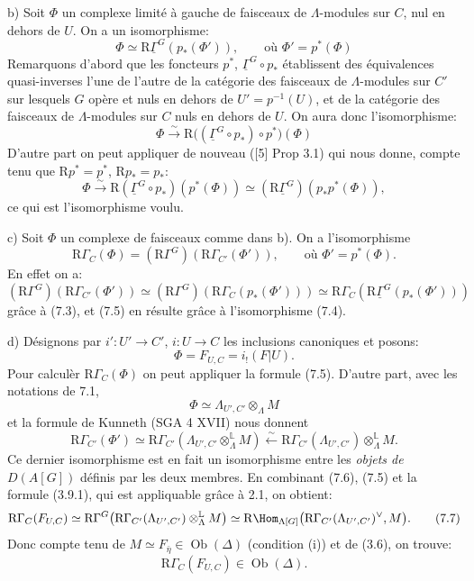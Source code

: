 b) Soit $\Phi$ un complexe limité à gauche de faisceaux de $\Lambda$-modules sur $C$, nul en dehors de $U$. On a un isomorphisme:
\[
\Phi\simeq \mathrm{R}\underline{\Gamma}^G(p_*(\Phi')),
\qquad\text{où } \Phi'=p^*(\Phi)
\tag{7.4}
\]
Remarquons d'abord que les foncteurs $p^*$, $\underline{\Gamma}^G\circ p_*$ établissent des équivalences quasi-inverses l'une de l'autre de la catégorie des faisceaux de $\Lambda$-modules sur $C'$ sur lesquels $G$ opère et nuls en dehors de $U'=p^{-1}(U)$, et de la catégorie des faisceaux de $\Lambda$-modules sur $C$ nuls en dehors de $U$. On aura donc l'isomorphisme:
\[
\Phi\xrightarrow{\sim} \mathrm{R}\bigl((\underline{\Gamma}^G\circ p_*)\circ p^*\bigr)(\Phi)
\]
D'autre part on peut appliquer de nouveau ([5] Prop 3.1) qui nous donne, compte tenu que $\mathrm{R} p^*=p^*$, $\mathrm{R} p_*=p_*$:
\[
\Phi\xrightarrow{\sim} \mathrm{R}(\underline{\Gamma}^G\circ p_*)(p^*(\Phi))
\simeq (\mathrm{R}\underline{\Gamma}^G)(p_*p^*(\Phi)),
\]
ce qui est l'isomorphisme voulu.

c) Soit $\Phi$ un complexe de faisceaux comme dans b). On a l'isomorphisme
\[
\mathrm{R}\Gamma_C(\Phi)=(\mathrm{R}\Gamma^G)(\mathrm{R}\Gamma_{C'}(\Phi')),
\qquad\text{où } \Phi'=p^*(\Phi).
\tag{7.5}
\]
En effet on a:
\[
(\mathrm{R}\Gamma^G)(\mathrm{R}\Gamma_{C'}(\Phi'))
\simeq
(\mathrm{R}\Gamma^G)(\mathrm{R}\Gamma_C(p_*(\Phi')))
\simeq
\mathrm{R}\Gamma_C(\mathrm{R}\underline{\Gamma}^G(p_*(\Phi')))
\]
grâce à (7.3), et (7.5) en résulte grâce à l'isomorphisme (7.4).

d) Désignons par $i':U'\to C'$, $i:U\to C$ les inclusions canoniques et posons:
\[
\Phi=F_{U,C}=i_!(F|U).
\]
Pour calculèr $\mathrm{R}\Gamma_C(\Phi)$ on peut appliquer la formule (7.5). D'autre part, avec les notations de 7.1,
\[
\Phi\simeq \Lambda_{U',C'}\otimes_\Lambda M
\]
et la formule de Kunneth (SGA 4 XVII) nous donnent
\[
\mathrm{R}\Gamma_{C'}(\Phi')
\simeq
\mathrm{R}\Gamma_{C'}(\Lambda_{U',C'}\otimes_\Lambda^{\mathbb{L}} M)
\xleftarrow{\sim}
\mathrm{R}\Gamma_{C'}(\Lambda_{U',C'})\otimes_\Lambda^{\mathbb{L}} M.
\tag{7.6}
\]
Ce
dernier isomorphisme est en fait un isomorphisme entre les \emph{objets de} $D(A[G])$ définis par les deux membres. En combinant (7.6), (7.5) et la formule (3.9.1), qui est appliquable grâce à 2.1, on obtient:
\[
\mathrm{R}\Gamma_C(F_{U,C})
\simeq
\mathrm{R}\Gamma^G\bigl(\mathrm{R}\Gamma_{C'}(\Lambda_{U',C'})\otimes_\Lambda^{\mathbb{L}} M\bigr)
\simeq
\mathrm{R}\Hom_{\Lambda[G]}\bigl(\mathrm{R}\Gamma_{C'}(\Lambda_{U',C'})^\vee,M\bigr).
\tag{7.7}
\]
Donc compte tenu de $M\simeq F_{\bar\eta}\in\operatorname{Ob}(\Delta)$ (condition (i)) et de (3.6), on trouve:
\[
\mathrm{R}\Gamma_C(F_{U,C})\in\operatorname{Ob}(\Delta).
\]

